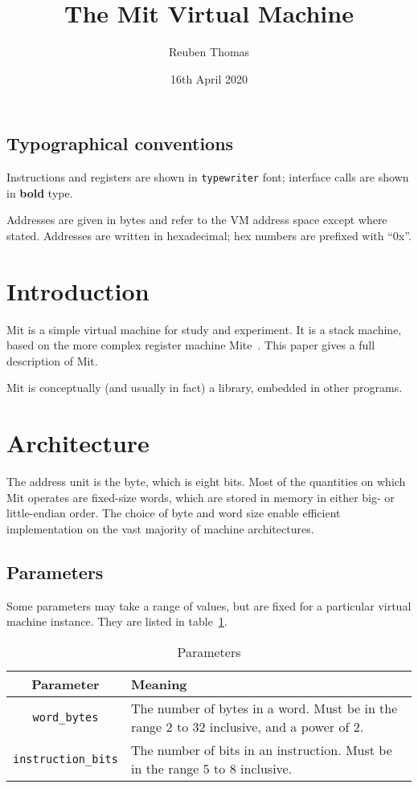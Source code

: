\documentclass[a4paper]{article}
\title{The Mit Virtual Machine}
\author{Reuben Thomas}
\date{16th April 2020}
\begin{document}
\maketitle

\subsection*{Typographical conventions}

Instructions and registers are shown in {\tt typewriter} font;
interface calls are shown in {\bf bold} type.

Addresses are given in bytes and refer to the VM address space except where
stated. Addresses are written in hexadecimal; hex numbers are prefixed with
“0x”.


\section{Introduction}

Mit is a simple virtual machine for study and experiment. It is a stack machine, based on the more complex register machine Mite~\cite{mite0}.
This paper gives a full description of Mit.

Mit is conceptually (and usually in fact) a library, embedded in other programs.


\section{Architecture}

The address unit is the byte, which is eight bits.
Most of the quantities on which Mit operates are fixed-size words, which are stored in memory in either big- or little-endian order.
The choice of byte and word size enable efficient implementation on the vast majority of machine architectures.


\subsection{Parameters}

Some parameters may take a range of values, but are fixed for a particular virtual machine instance. They are listed in table~\ref{paramtable}.

\begin{table}[htbp]
\begin{center}
\begin{tabular}{cp{3.75in}} \toprule
\bf Parameter & \bf Meaning \\
 \midrule
{\tt word\_bytes} & The number of bytes in a word. Must be in the range $2$ to $32$ inclusive, and a power of $2$. \\
{\tt instruction\_bits} & The number of bits in an instruction. Must be in the range $5$ to $8$ inclusive. \\
 \bottomrule
\end{tabular}
\caption{\label{paramtable}Parameters}
\end{center}
\end{table}
\end{document}
